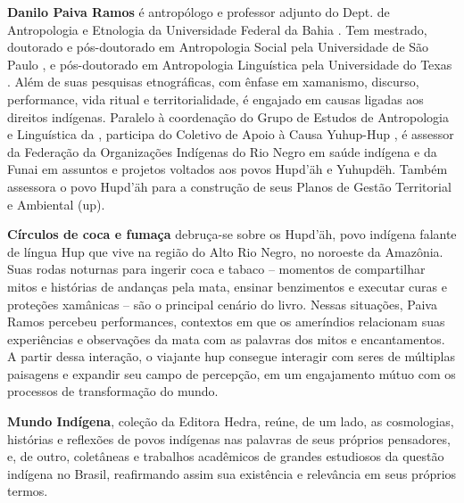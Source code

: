 \textbf{Danilo Paiva Ramos} é antropólogo e professor adjunto do Dept. de Antropologia e Etnologia da Universidade Federal da Bahia . Tem mestrado, doutorado e pós-doutorado em Antropologia Social pela Universidade de São Paulo , e pós-doutorado em Antropologia Linguística pela Universidade do Texas . Além de suas pesquisas etnográficas, com ênfase em xamanismo, discurso, performance, vida ritual e territorialidade, é engajado em causas ligadas aos direitos indígenas. Paralelo à coordenação do Grupo de Estudos de Antropologia e Linguística  da , participa do Coletivo de Apoio à Causa Yuhup-Hup , é assessor da Federação da Organizações Indígenas do Rio Negro  em saúde indígena e da Funai em assuntos e projetos voltados aos povos Hupd'äh e Yuhupdëh. Também assessora o povo Hupd'äh para a construção de seus Planos de Gestão Territorial e Ambiental (up).


\textbf{Círculos de coca e fumaça} debruça-se sobre os Hupd’äh, povo indígena falante de língua Hup que vive na região do Alto Rio Negro, no noroeste da Amazônia. Suas rodas noturnas para ingerir coca e tabaco -- momentos de compartilhar mitos e histórias de andanças pela mata, ensinar benzimentos e executar curas e proteções xamânicas -- são o principal cenário do livro. Nessas situações, Paiva Ramos percebeu performances, contextos em que os ameríndios relacionam suas experiências e observações da mata com as palavras dos mitos e encantamentos. A partir dessa interação, o viajante hup consegue interagir com seres de múltiplas paisagens e expandir seu campo de percepção, em um engajamento mútuo com os processos de transformação do mundo.


\textbf{Mundo Indígena}, coleção da Editora Hedra, reúne, de um lado, as cosmologias, histórias e reflexões de povos indígenas nas palavras de seus próprios pensadores, e, de outro, coletâneas e trabalhos acadêmicos de grandes estudiosos da questão indígena no Brasil, reafirmando assim sua existência e relevância em seus próprios termos.\par